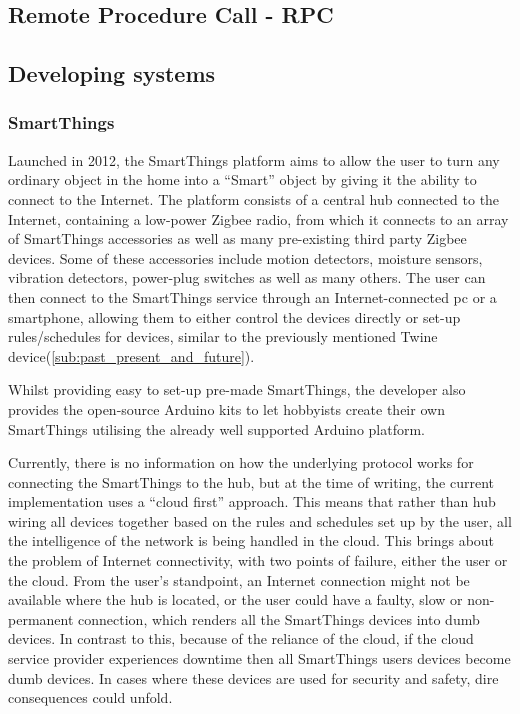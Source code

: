 

\subsection{Remote Procedure Call - RPC} %
\label{sub:rpc}


\subsection{Developing systems} %
\label{sub:developing_systems}

\subsubsection{SmartThings} %
\label{ssub:smart_things}
Launched in 2012, the SmartThings platform aims to allow the user to turn any ordinary object in the home into a ``Smart'' object by giving it the ability to connect to the Internet. The platform consists of a central hub connected to the Internet, containing a low-power Zigbee radio, from which it connects to an array of SmartThings accessories as well as many pre-existing third party Zigbee devices. Some of these accessories include motion detectors, moisture sensors, vibration detectors, power-plug switches as well as many others. The user can then connect to the SmartThings service through an Internet-connected pc or a smartphone, allowing them to either control the devices directly or set-up rules/schedules for devices, similar to the previously mentioned Twine device(\ref{sub:past_present_and_future}). 

Whilst providing easy to set-up pre-made SmartThings, the developer also provides the open-source Arduino kits to let hobbyists create their own SmartThings utilising the already well supported Arduino platform.

Currently, there is no information on how the underlying protocol works for connecting the SmartThings to the hub, but at the time of writing, the current implementation uses a ``cloud first'' approach. This means that rather than hub wiring all devices together based on the rules and schedules set up by the user, all the intelligence of the network is being handled in the cloud. This brings about the problem of Internet connectivity, with two points of failure, either the user or the cloud. From the user's standpoint, an Internet connection might not be available where the hub is located, or the user could have a faulty, slow or non-permanent connection, which renders all the SmartThings devices into dumb devices. In contrast to this, because of the reliance of the cloud, if the cloud service provider experiences downtime then all SmartThings users devices become dumb devices. In cases where these devices are used for security and safety, dire consequences could unfold.
  



